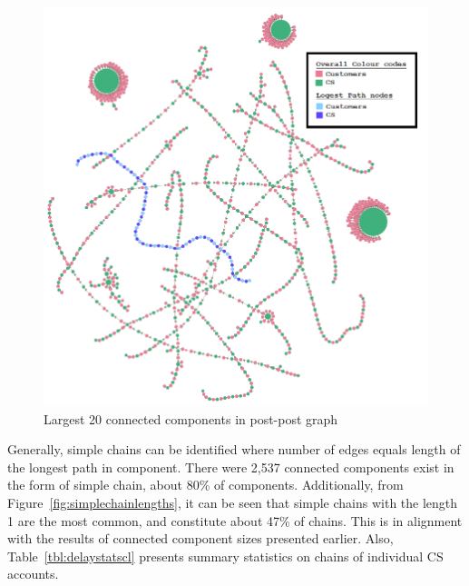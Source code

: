 \documentclass[sigconf]{acmart}
\begin{document}
\begin{figure}[htb]
\centering
\includegraphics[width=\columnwidth]{images/20ccpostpostgraph.png}
\caption{Largest 20 connected components in post-post graph}
\label{fig:20ccpostpostgraph}
\end{figure}

Generally, simple chains can be identified where number of edges
equals length of the longest path in component. There were 2,537
connected components exist in the form of simple chain, about 80\% of
components. Additionally, from Figure~\ref{fig:simplechainlengths}, it
can be seen that simple chains with the length 1 are the most common,
and constitute about 47\% of chains. This is in alignment with the
results of connected component sizes presented earlier. Also,
Table~\ref{tbl:delaystatscl} presents summary statistics on chains of
individual CS accounts.
\end{document}
